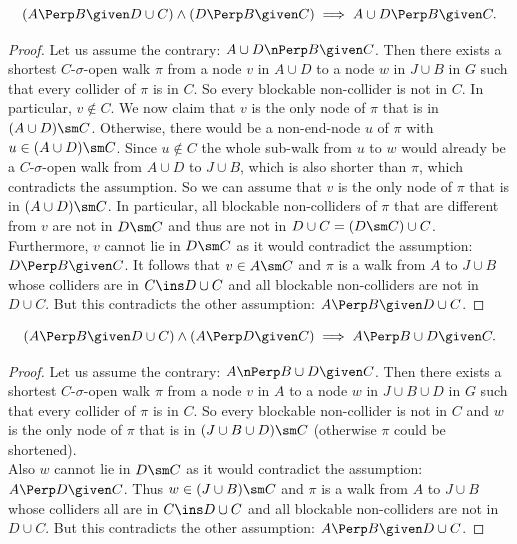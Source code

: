 \begin{Lem} 
        \label{s-sep-left-contraction}
    \[ (A \Perp  B \given D \cup  C) \land (D \Perp  B \given C) \implies A \cup  D \Perp  B \given C.\]
\begin{proof}
    Let us assume the contrary:  $A \cup D \nPerp  B \given C$.
    Then there exists a shortest $C$-$\sigma$-open walk $\pi$ 
    from a node $v$ in $A \cup D$ to a node $w$ in $J \cup B$ in $G$ such that every collider of $\pi$ is in $C$. 
    So every blockable non-collider is not in $C$. In particular, $v \notin C$.  
    We now claim that $v$ is the only node of $\pi$ that is in $(A \cup D) \sm C$. 
    Otherwise, there would be a non-end-node $u$ of $\pi$ with $u \in (A \cup D) \sm C$. 
    Since $u \notin C$ the whole sub-walk from $u$ to $w$ would already be a $C$-$\sigma$-open walk from $A \cup D$ to $J \cup B$,
    which is also shorter than $\pi$, which contradicts the assumption. 
    So we can assume that $v$ is the only node of $\pi$ that is in $(A \cup D) \sm C$. 
    In particular, all blockable non-colliders of $\pi$ that are different from $v$ are not in $D \sm C$ 
    and thus are not in $D \cup C = (D \sm C) \cup C$.\\
    Furthermore, $v$ cannot lie in $D\sm C$ as it would contradict the assumption: $D \Perp  B \given C$.
    It follows that $v \in A \sm C$ and $\pi$ is a walk from $A$ to $J \cup B$ whose colliders are in $C \ins D \cup C$ 
    and all blockable non-colliders are not in $D \cup C$.
    But this contradicts the other assumption: $A \Perp  B \given D \cup  C$.
\end{proof}
\end{Lem}

\begin{Lem}
  \label{s-sep-right-contraction}
    \[ (A \Perp  B \given D \cup  C) \land (A \Perp  D \given C)  \implies A \Perp  B \cup  D \given C.\]
\begin{proof}
    Let us assume the contrary:  $A  \nPerp  B \cup D \given C$.
    Then there exists a shortest $C$-$\sigma$-open walk $\pi$ 
    from a node $v$ in $A$ to a node $w$ in $J \cup B \cup D$ in $G$ such that  every collider of $\pi$ is in $C$.
    So every blockable non-collider is not in $C$ and $w$ is 
    the only node of $\pi$ that is in $(J \cup B \cup D)\sm C$ (otherwise $\pi$ could be shortened). \\
    Also $w$ cannot lie in $D\sm C$ as it would contradict the assumption: $A \Perp  D \given C$.
    Thus $w \in (J \cup B) \sm C$ and $\pi$ is a walk from $A$ to $J \cup B$ whose colliders all are in $C \ins D \cup C$ 
    and all blockable non-colliders are not in $D \cup C$.
    But this contradicts the other assumption: $A \Perp  B \given D \cup  C$.
\end{proof}
\end{Lem}

